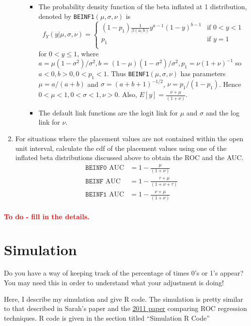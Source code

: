 \documentclass{article}
\newcommand{\be}{\beta}
\newcommand{\si}{\sigma}
\begin{document}
\begin{enumerate}
\begin{itemize}
\begin{itemize}
            \item The probability density function of the beta inflated at 1 distribution, denoted by \texttt{BEINF1}$(\mu, \si, \nu)$ is
            $$f_Y(y|\mu, \si, \nu) = \begin{cases}
            (1 - p_1)\frac{1}{\be(a,b)}y^{a - 1}(1 - y)^{b-1} & \text{if $0 < y < 1$} \\
            p_1 & \text{if $y = 1$} \\
            \end{cases}$$
            for $0 < y \leq 1$, where $a = \mu(1 - \si^2)/\si^2, b = (1 - \mu)(1 - \si^2)/\si^2, p_1 = \nu(1 + \nu)^{-1}$ so $a < 0, b > 0, 0 < p_1 < 1$. Thus \texttt{BEINF1}$(\mu, \si, \nu)$ has parameters $\mu = a/(a+b)$ and $\si = (a + b + 1)^{-1/2}$, $\nu = p_1/(1 - p_1)$. Hence $0 < \mu < 1, 0 < \si < 1, \nu > 0$. Also, $E[y] = \frac{\nu + \mu}{(1 + \nu)}$.
            \item The default link functions are the logit link for $\mu$ and $\si$ and the log link for $\nu$.
        \end{itemize}
    \end{itemize}
    \item For situations where the placement values are not contained within the open unit interval, calculate the cdf of the placement values using one of the inflated beta distributions discussed above to obtain the ROC and the AUC.
    \begin{align*}
        \texttt{BEINF0 } \text{AUC} &= 1 - \frac{\mu}{(1 + \nu)} \\
        \texttt{BEINF } \text{AUC} &= 1 - \frac{\tau + \mu}{(1 + \nu + \tau)} \\
        \texttt{BEINF1 } \text{AUC} &= 1 - \frac{\nu + \mu}{(1 + \nu)} \\
    \end{align*}
\end{enumerate}

\textcolor{red}{\textbf{To do - fill in the details.}}



\section{Simulation}
{\color{blue} Do you have a way of keeping track of the percentage of times 0's or 1's appear? You may need this in order to understand what your adjustment is doing!}


Here, I describe my simulation and give R code. The simulation is pretty similar to that described in Sarah's paper and the \href{https://www.sciencedirect.com/science/article/pii/S0167947310002975}{2011 paper} comparing ROC regression techniques. R code is given in the section titled ``Simulation R Code''
\end{document}
